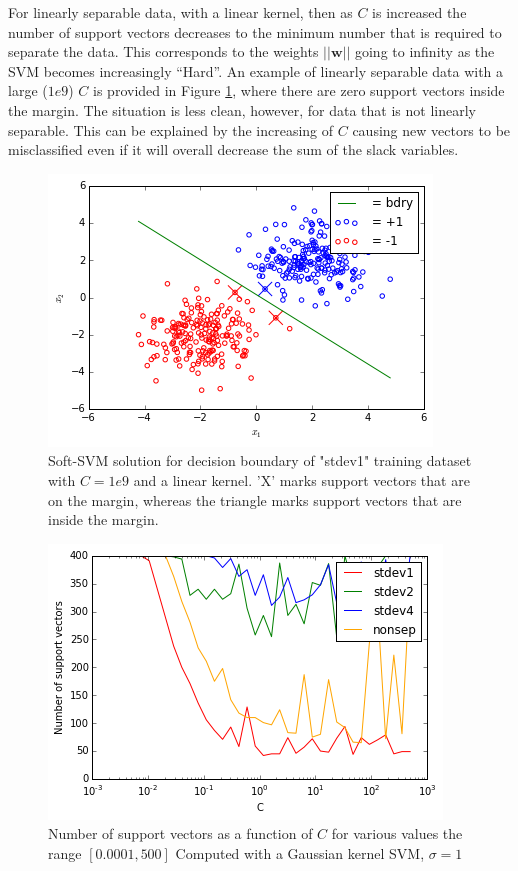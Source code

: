 \documentclass[10pt]{article}
\begin{document}
For linearly separable data, with a linear kernel, then as $C$ is increased the number of support vectors decreases to the minimum number that is required to separate the data.  This corresponds to the weights $||\mathbf{w}||$ going to infinity as the SVM becomes increasingly ``Hard''.  An example of linearly separable data with a large ($1e9$) $C$ is provided in Figure \ref{highC}, where there are zero support vectors inside the margin.  The situation is less clean, however, for data that is not linearly separable.  This can be explained by the increasing of $C$ causing new vectors to be misclassified even if it will overall decrease the sum of the slack variables.
\begin{figure}
\centering
\includegraphics[scale=0.5]{svm_highC_stdev1.png}
\caption{Soft-SVM solution for decision boundary of "stdev1" training dataset with $C=1e9$ and a linear kernel.  'X' marks support vectors that are on the margin, whereas the triangle marks support vectors that are inside the margin.}
\label{highC}
\end{figure}
\begin{figure}
\centering
\includegraphics[scale=0.5]{supportvectors.png}
\caption{Number of support vectors as a function of $C$ for various values the range $[0.0001, 500]$ Computed with a Gaussian kernel SVM, $\sigma=1$}
\label{supportvectors}
\end{figure}
\end{document}
